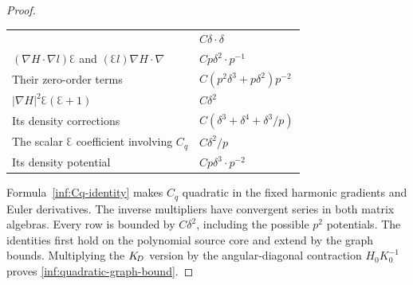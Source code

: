 \begin{proof}
\begin{center}
\begin{tabular}{@{}>{\raggedright\arraybackslash}p{}>{\raggedright\arraybackslash}p{}@{}}
 & $C\delta\cdot\delta$\\
$(\nabla H\cdot\nabla l)\Euler$ and
$(\Euler l)\nabla H\cdot\nabla$ & $Cp\delta^2\cdot p^{-1}$\\
Their zero-order terms & $C(p^2\delta^3+p\delta^2)p^{-2}$\\
$|\nabla H|^2\Euler(\Euler+1)$ & $C\delta^2$\\
Its density corrections & $C(\delta^3+\delta^4+\delta^3/p)$\\
The scalar $\Euler$ coefficient involving $C_q$ & $C\delta^2/p$\\
Its density potential & $Cp\delta^3\cdot p^{-2}$\\
\bottomrule
\end{tabular}
\end{center}
Formula~\eqref{inf:Cq-identity} makes $C_q$ quadratic in the fixed
harmonic gradients and Euler derivatives. The inverse multipliers
have convergent series in both matrix algebras. Every row is bounded
by $C\delta^2$, including the possible $p^2$ potentials. The identities
first hold on the polynomial source core and extend by the graph
bounds. Multiplying the $K_{\!D}$ version by the angular-diagonal
contraction $H_0K_0^{-1}$ proves \eqref{inf:quadratic-graph-bound}.
\end{proof}
